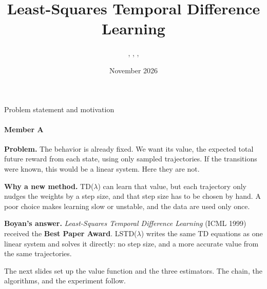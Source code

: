 \documentclass[aspectratio=169,11pt]{beamer}
\title{Least-Squares Temporal Difference Learning}
\author{\memberA, \memberB, \memberC, \memberD}
\date{November 2026}
\newcommand{\memberA}{Member A}
\newcommand{\darkbg}{\fill[ink] (current page.south west) rectangle (current page.north east);}
\newcommand{\speaker}[1]{\framesubtitle{#1}}
\newcommand{\hl}[1]{\textcolor{accent}{\textbf{#1}}}
\begin{document}
\begin{frame}
\end{frame}

\begin{frame}{Problem statement and motivation}
  \speaker{\memberA}
  \small
  \textbf{Problem.} The behavior is already fixed. We want its value, the expected total future reward from each state, using only sampled trajectories. If the transitions were known, this would be a linear system. Here they are not.
  \vspace{0.55em}

  \textbf{Why a new method.} TD($\lambda$) can learn that value, but each trajectory only nudges the weights by a step size, and that step size has to be chosen by hand. A poor choice makes learning slow or unstable, and the data are used only once.
  \vspace{0.55em}

  \textbf{Boyan's answer.} \emph{Least-Squares Temporal Difference Learning} (ICML 1999) received the \hl{Best Paper Award}. LSTD($\lambda$) writes the same TD equations as one linear system and solves it directly: no step size, and a more accurate value from the same trajectories.
  \vspace{0.55em}

  The next slides set up the value function and the three estimators. The chain, the algorithms, and the experiment follow.
\end{frame}
\end{document}
